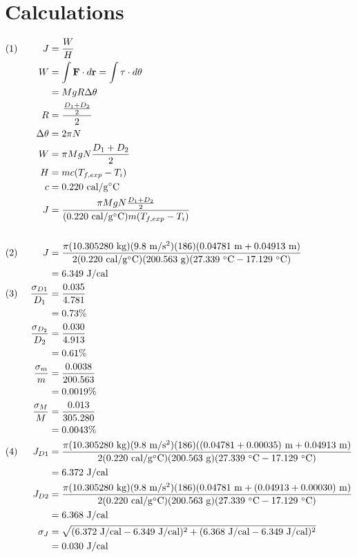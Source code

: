 \documentclass[12pt]{article}
\newcommand{\cel}{\degree \mathrm{C}}
\newcommand{\units}[1]{\mathrm{~#1}}
\begin{document}
    \section{Calculations}
        \begin{alignat*}{3}
            (1)~
            &&J&=\frac{W}{H}\\
            &&W&=\int \mathbf{F}\cdot d\mathbf{r} =\int \mathbf{\tau} \cdot d\mathbf{\theta}\\ 
            &&&=MgR\Delta\theta\\
            &&R&=\frac{\frac{D_1+D_2}{2}}{2}\\
            &&\Delta\theta&=2\pi N\\
            &&W&=\pi MgN\frac{D_1+D_2}{2}\\
            &&H&=mc(T_{f,exp}-T_i)\\
            &&c&=0.220 \units{cal/g\cel}\\
            &&J&=\frac{\pi MgN\frac{D_1+D_2}{2}}{(0.220 \units{cal/g\cel})m(T_{f,exp}-T_i)}\\\\
            (2)~
            &&J&=\frac{\pi (10.305280 \units{kg})(9.8 \units{m/s^2})(186)(0.04781 \units{m}+0.04913 \units{m})}{2(0.220 \units{cal/g\cel})(200.563 \units{g})(27.339 \units{\cel} - 17.129 \units{\cel})}\\
            &&&= 6.349 \units{J/cal}\\
            (3)~
            &&\frac{\sigma_{D1}}{D_1}&=\frac{0.035}{4.781}\\
            &&&=0.73\%\\
            &&\frac{\sigma_{D_2}}{D_2}&=\frac{0.030}{4.913}\\
            &&&=0.61\%\\
            &&\frac{\sigma_m}{m}&=\frac{0.0038}{200.563}\\
            &&&=0.0019\%\\
            &&\frac{\sigma_M}{M}&=\frac{0.013}{305.280}\\
            &&&=0.0043\%\\
            (4)~
            &&J_{D1}&=\frac{\pi (10.305280 \units{kg})(9.8 \units{m/s^2})(186)((0.04781+0.00035) \units{m}+0.04913 \units{m})}{2(0.220 \units{cal/g\cel})(200.563 \units{g})(27.339 \units{\cel} - 17.129 \units{\cel})}\\
            &&&=6.372\units{J/cal}\\
            &&J_{D2}&=\frac{\pi (10.305280 \units{kg})(9.8 \units{m/s^2})(186)(0.04781 \units{m}+(0.04913+0.00030 ) \units{m})}{2(0.220 \units{cal/g\cel})(200.563 \units{g})(27.339 \units{\cel} - 17.129 \units{\cel})}\\
            &&&=6.368\units{J/cal}\\
            &&\sigma_J &=\sqrt{(6.372\units{J/cal} - 6.349 \units{J/cal})^2+(6.368\units{J/cal}- 6.349 \units{J/cal})^2}\\
            &&&=0.030 \units{J/cal}
        \end{alignat*}
\end{document}
